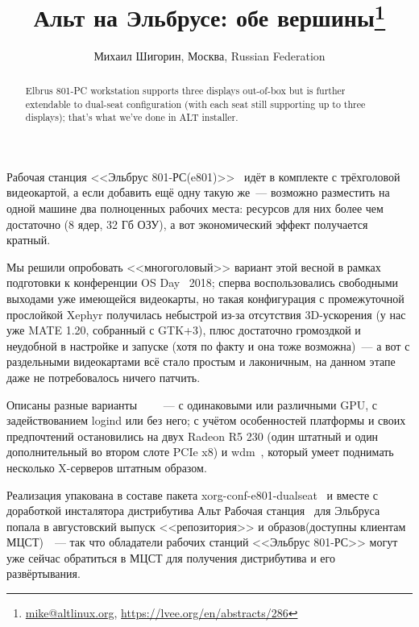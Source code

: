 \documentclass[10pt, a5paper]{article}
\begin{document}
\title{Альт на Эльбрусе: обе вершины\footnote{\url{mike@altlinux.org}, \url{https://lvee.org/en/abstracts/286}}}
\author{Михаил Шигорин, Москва, Russian Federation}
\maketitle
\begin{abstract}
Elbrus 801-PC workstation supports three displays out-of-box but is further extendable to dual-seat configuration (with each seat still supporting up to three displays); that's what we've done in ALT installer.
\end{abstract}
Рабочая станция <<Эльбрус 801-РС(e801)>>~\cite{Shigorin-1} идёт в комплекте с трёхголовой видеокартой, а если добавить ещё одну такую же~--- возможно разместить на одной машине два полноценных рабочих места: ресурсов для них более чем достаточно (8 ядер, 32 Гб ОЗУ), а вот экономический эффект получается кратный.

Мы решили опробовать <<многоголовый>> вариант этой весной в рамках подготовки к конференции OS Day~\cite{Shigorin-2} 2018; сперва воспользовались свободными выходами уже имеющейся видеокарты, но такая конфигурация с промежуточной прослойкой Xephyr получилась небыстрой из-за отсутствия 3D-ускорения (у нас уже MATE 1.20, собранный с GTK+3), плюс достаточно громоздкой и неудобной в настройке и запуске (хотя по факту и она тоже возможна)~--- а вот с раздельными видеокартами всё стало простым и лаконичным, на данном этапе даже не потребовалось ничего патчить.

Описаны разные варианты~\cite{Shigorin-3}~\cite{Shigorin-4}~\cite{Shigorin-5} ~--- с одинаковыми или различными GPU, с задействованием logind или без него; с учётом особенностей платформы и своих предпочтений  остановились на двух Radeon R5 230 (один штатный и один дополнительный во втором слоте PCIe x8) и wdm~\cite{Shigorin-6}, который умеет поднимать несколько X-серверов штатным образом.

Реализация упакована в составе пакета xorg-conf-e801-dualseat~\cite{Shigorin-7} и вместе с доработкой инсталятора дистрибутива Альт Рабочая станция~\cite{Shigorin-8} для Эльбруса попала в августовский выпуск <<репозитория>> и образов(доступны клиентам МЦСТ)~\cite{Shigorin-9}~--- так что обладатели рабочих станций <<Эльбрус 801-РС>> могут уже сейчас обратиться в МЦСТ для получения дистрибутива и его развёртывания.
\end{document}
